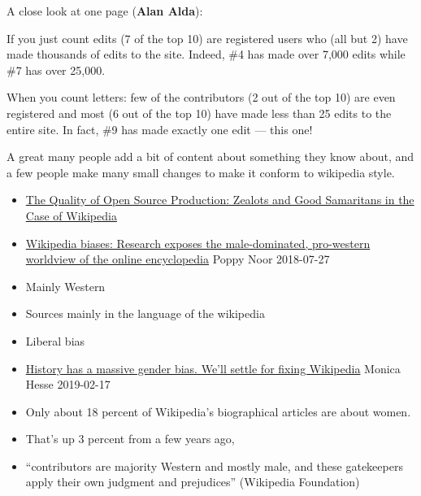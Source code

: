 \documentclass[a4paper,landscape,headrule,footrule,xetex]{foils}
\begin{document}

A close look at one page (\textbf{Alan Alda}):

If you just count edits (7 of the top 10) are registered users who
(all but 2) have made thousands of edits to the site. Indeed, \#4 has
made over 7,000 edits while \#7 has over 25,000.

When you count letters: few of the contributors (2 out of the top 10)
are even registered and most (6 out of the top 10) have made less than
25 edits to the entire site. In fact, \#9 has made exactly one edit —
this one!

A great many people add a bit of content about something they know
about, and a few people make many small changes to make it conform to
wikipedia style.

\begin{itemize}
\item \href{https://www.cs.dartmouth.edu/~trdata/reports/abstracts/TR2007-606/}{The Quality of Open Source Production: Zealots and Good Samaritans in the Case of Wikipedia }
\end{itemize}



\begin{itemize}
\item  \href{https://www.theguardian.com/technology/2018/jul/29/the-five-wikipedia-biases-pro-western-male-dominated}{Wikipedia
    biases: 
Research exposes the male-dominated, pro-western worldview of the online encyclopedia}
  Poppy   Noor 2018-07-27
\item Mainly Western
\item Sources mainly in the language of the wikipedia
\item Liberal bias              %
\item  \href{https://www.washingtonpost.com/lifestyle/style/history-has-a-massive-gender-bias-well-settle-for-fixing-wikipedia/2019/02/15/b2537640-3163-11e9-86ab-5d02109aeb01_story.html?utm_term=.7d4409494928}{History
    has a massive gender bias. We'll settle for fixing Wikipedia}
  Monica Hesse 2019-02-17
\item Only about 18 percent of Wikipedia’s biographical articles are
  about women.
\item  That's up 3 percent from a few years ago,
\item ``contributors are majority Western and mostly male, and these
  gatekeepers apply their own judgment and prejudices'' (Wikipedia Foundation)
\end{itemize}
\end{document}
